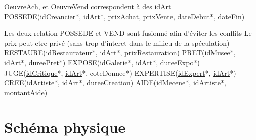 \documentclass{article}
\begin{document}
OeuvreAch, et OeuvreVend correspondent à des idArt \newline
\\
POSSEDE(\underline{\underline{idCreancier}}*, \underline{\underline{idArt}}*, prixAchat, prixVente, dateDebut*, dateFin) \newline

Les deux relation POSSEDE et VEND sont fusionné afin d'éviter les conflits \newline
Le prix peut etre privé (sans trop d'interet dans le milieu de la spéculation) \newline
\\
RESTAURE(\underline{\underline{idRestaurateur}}*, \underline{\underline{idArt}}*, prixRestauration) \newline
PRET(\underline{\underline{idMusee}}*, \underline{\underline{idArt}}*, dureePret*) \newline
EXPOSE(\underline{\underline{idGalerie}}*, \underline{\underline{idArt}}*, dureeExpo*) \newline
JUGE(\underline{\underline{idCritique}}*, \underline{\underline{idArt}}*, coteDonnee*) \newline
EXPERTISE(\underline{\underline{idExpert}}*, \underline{\underline{idArt}}*) \newline
CREE(\underline{\underline{idArtiste}}*, \underline{\underline{idArt}}*, dureeCreation) \newline
AIDE(\underline{\underline{idMecene}}*, \underline{\underline{idArtiste}}*, montantAide) \newline


\clearpage

\section{Schéma physique}
\end{document}
